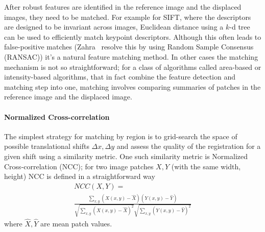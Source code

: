 After robust features are identified in the reference image and the displaced images, they need to be matched.
%
For example for SIFT, where the descriptors are designed to be invariant across images, Euclidean distance using a \(k\)-d tree can be used to efficiently match keypoint descriptors.
%
Although this often leads to false-positive matches (Zahra \etal~resolve this by using Random Sample Consensus (RANSAC)) it's a natural feature matching method.
%
In other cases the matching mechanism is not so straightforward; for a class of algorithms called area-based or intensity-based algorithms, that in fact combine the feature detection and matching step into one, matching involves comparing summaries of patches in the reference image and the displaced image.

\paragraph{Normalized Cross-correlation}
The simplest strategy for matching by region is to grid-search the space of possible translational shifts \(\Delta x, \Delta y\) and assess the quality of the registration for a given shift using a similarity metric.
%
One such similarity metric is Normalized Cross-correlation (NCC); for two image patches \(X, Y\) (with the same width, height) NCC is defined in a straightforward way
\begin{multline}
    NCC(X, Y) = \\ \frac{\sum_{x,y} \left(X(x,y) - \hat{X}\right) \left(Y(x,y) - \hat{Y}\right)}{\sqrt{\sum_{x,y} \left(X(x,y) - \hat{X}\right)^2} \sqrt{ \sum_{x,y} \left(Y(x,y) - \hat{Y}\right)^2 }}
\end{multline}
where \(\hat{X}, \hat{Y}\) are mean patch values.

